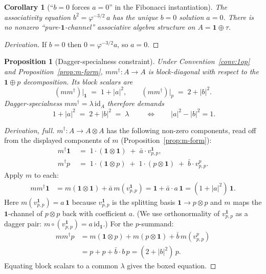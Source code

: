 \documentclass[11pt,a4paper]{article}
\newtheorem{proposition}[definition]{Proposition}
\newtheorem{corollary}[definition]{Corollary}
\theoremstyle{definition}
\newcommand{\id}{\mathrm{id}}
\newcommand{\one}{\mathbf{1}}
\begin{document}
\begin{corollary}[``$b=0$ forces $a=0$'' in the Fibonacci instantiation]\label{cor:b-zero-forces-a-zero}
The associativity equation $b^{2} = \varphi^{-3/2}\,a$ has the unique
$b=0$ solution $a = 0$. There is no nonzero ``pure-$\one$-channel''
associative algebra structure on $A=\one\oplus\tau$.
\end{corollary}
\begin{proof}[Derivation] If $b=0$ then $0 = \varphi^{-3/2}a$, so $a=0$. \end{proof}

\begin{proposition}[Dagger-specialness constraint]\label{prop:dagger-special-eq}
Under Convention~\ref{conv:1op} and Proposition~\ref{prop:m-form},
$mm^{\dagger}:A\to A$ is block-diagonal with respect to the $\one\oplus p$
decomposition. Its block scalars are
\[
(mm^{\dagger})\big|_{\one} \;=\; 1 + |a|^{2}, \qquad
(mm^{\dagger})\big|_{p} \;=\; 2 + |b|^{2}.
\]
Dagger-specialness $mm^{\dagger} = \lambda\,\id_A$ therefore demands
\[
\boxed{\; 1 + |a|^{2} \;=\; 2 + |b|^{2} \;=\; \lambda \;}
\qquad\Longleftrightarrow\qquad |a|^{2} - |b|^{2} = 1.
\]
\end{proposition}

\begin{proof}[Derivation, full]
$m^{\dagger}:A\to A\otimes A$ has the following non-zero components, read off
from the displayed components of $m$ (Proposition~\ref{prop:m-form}):
\begin{align*}
m^{\dagger}\one &\;=\; 1\cdot(\one\otimes\one) \;+\; \bar a\cdot v^{\one}_{p,p},\\
m^{\dagger} p   &\;=\; 1\cdot(\one\otimes p)\;+\; 1\cdot(p\otimes\one) \;+\; \bar b\cdot v^{p}_{p,p}.
\end{align*}
Apply $m$ to each:
\begin{align*}
mm^{\dagger}\one
&= m(\one\otimes\one) + \bar a\,m(v^{\one}_{p,p})
 = \one + \bar a\cdot a\,\one
 = (1 + |a|^{2})\,\one.
\end{align*}
Here $m(v^{\one}_{p,p}) = a\,\one$ because $v^{\one}_{p,p}$ is the
splitting basis $\one\to p\otimes p$ and $m$ maps the $\one$-channel of
$p\otimes p$ back with coefficient $a$. (We use orthonormality of
$v^{\one}_{p,p}$ as a dagger pair: $m\circ(v^{\one}_{p,p}) = a\,\id_\one$.)
For the $p$-summand:
\begin{align*}
mm^{\dagger}p
&= m(\one\otimes p) + m(p\otimes\one) + \bar b\,m(v^{p}_{p,p})\\
&= p + p + \bar b\cdot b\,p
 = (2 + |b|^{2})\,p.
\end{align*}
Equating block scalars to a common $\lambda$ gives the boxed equation.
\end{proof}
\end{document}
